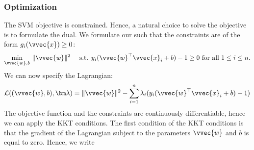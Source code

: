 \documentclass[letterpaper,10pt,english]{jupyterBook}
\begin{document}
\subsubsection{Optimization}
\label{\detokenize{classification_svms:optimization}}
\sphinxAtStartPar
The SVM objective is constrained. Hence, a natural choice to solve the objective is to formulate the dual. We formulate our  such that the constraints are of the form \(g_i(\vvec{x})\geq 0\):
\begin{equation*}
\begin{split}\min_{\vvec{w},b}\ \lVert \vvec{w}\rVert^2\quad\text{ s.t. } y_i(\vvec{w}^\top\vvec{x}_i+b)-1\geq 0 \text{ for all }1\leq i\leq n.\end{split}
\end{equation*}
We can now specify the Lagrangian:
\begin{equation}\label{equation:classification_svms:svm_lagrangian}
\begin{split}\mathcal{L}((\vvec{w},b),\bm\lambda) = \lVert \vvec{w}\rVert^2 - \sum_{i=1}^n \lambda_i(y_i(\vvec{w}^\top\vvec{x}_i+b)-1)\end{split}
\end{equation}
\sphinxAtStartPar
The objective function and the constraints are continuously differentiable, hence we can apply the KKT conditions. The first condition of the KKT conditions is that the gradient of the Lagrangian subject to the parameters \(\vvec{w}\) and \(b\) is equal to zero.
Hence, we write
\end{document}
